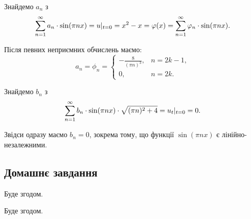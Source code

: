 \begin{solution}
	Знайдемо $a_n$ з
	\begin{equation*}
		\displaystyle\sum\limits_{n = 1}^\infty a_n \cdot \sin(\pi n x) = u|_{t = 0} = x^2 - x = \varphi(x) = \displaystyle\sum\limits_{n = 1}^\infty \varphi_n \cdot \sin(\pi n x).
	\end{equation*}

	Після певних неприємних обчислень маємо:
	\begin{equation*}
		a_n = \phi_n = \begin{cases} -\frac{8}{(\pi n)^3}, & n = 2 k - 1, \\ 0, & n = 2 k. \end{cases}
	\end{equation*}

	Знайдемо $b_n$ з
	\begin{equation*}
		\displaystyle\sum\limits_{n = 1}^\infty b_n \cdot \sin(\pi n x) \cdot \sqrt{(\pi n)^2 + 4} = u_t|_{t = 0} = 0.
	\end{equation*}
	
	Звідси одразу маємо $b_n = 0$, зокрема тому, що функції $\sin (\pi n x)$ є лінійно-незалежними.
\end{solution}

\subsection{Домашнє завдання}

\begin{problem}[Владіміров, №20.14.1]
	Буде згодом.
\end{problem}

\begin{solution}
	Буде згодом.
\end{solution}


